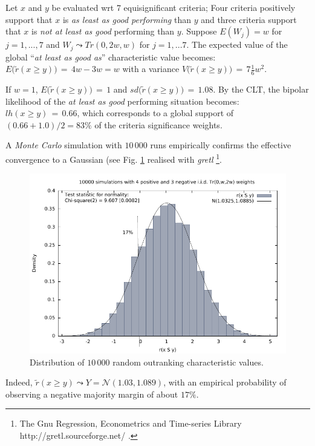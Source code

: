 \begin{example} Let $x$ and $y$ be evaluated wrt 7 equisignificant criteria; Four criteria positively support that $x$ is \emph{as least as good performing} than $y$ and three criteria support that $x$ is \emph{not at least as good} performing than $y$. Suppose $E(W_j) = w$ for $j = 1,...,7$ and $W_j \leadsto Tr(0, 2w, w)$ for $j = 1,...7$. The expected value of the global ``\emph{at least as good as}'' characteristic value becomes: $E\big(\tilde{r}(x \geq y)\big)\, = \, 4w - 3w = w$ with a variance $V\big(\tilde{r}(x \geq y)\big)\,=\, 7\frac{1}{6}w^2$. 

If $w = 1$, $E\big(\tilde{r}(x \geq y)\big)\, = \, 1$ and $sd\big(\tilde{r}(x \geq y)\big)\,=\, 1.08$. By the CLT, the bipolar likelihood of the \emph{at least as good} performing situation becomes: $lh(x \geq y)\,=\, 0.66$, which corresponds to a global support of $(0.66 + 1.0)/2 = 83\%$ of the criteria significance weights.

A \emph{Monte Carlo} simulation with $10\,000$ runs empirically confirms the effective convergence to a Gaussian (see Fig. \ref{fig:18.3} realised with \emph{gretl} \footnote{The Gnu Regression, Econometrics and Time-series Library http://gretl.sourceforge.net/ .}.
\begin{figure}[h]
\includegraphics[width=12cm]{Figures/simulLikelihood.pdf}
\caption{Distribution of $10\,000$ random outranking characteristic values.}
\label{fig:18.3}       %
\end{figure}
Indeed, $\tilde{r}(x \geq y) \leadsto Y = \mathcal{N}(1.03,1.089)$, with an empirical probability of observing a negative majority margin of about $17\%$.
\end{example}

